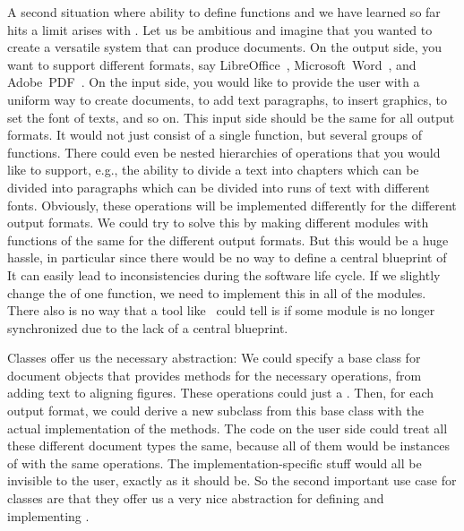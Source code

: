 A second situation where ability to define functions and we have learned so far hits a limit arises with .
Let us be ambitious and imagine that you wanted to create a versatile system that can produce documents.
On the output side, you want to support different formats, say LibreOffice~\cite{DF2024LTDF,GL2012LTSOOSSCBAFACSOL}, Microsoft~Word~\cite{MS2024MW,DR2019STFAWAUMW}, and Adobe~PDF~\cite{A2024WDPM,A2008P3DMPDFP1P1}.
On the input side, you would like to provide the user with a uniform way to create documents, to add text paragraphs, to insert graphics, to set the font of texts, and so on.
This input side  should be the same for all output formats.
It would not just consist of a single function, but several groups of functions.
There could even be nested hierarchies of operations that you would like to support, e.g., the ability to divide a text into chapters which can be divided into paragraphs which can be divided into runs of text with different fonts.
Obviously, these operations will be implemented differently for the different output formats.
We could try to solve this by making different modules with functions of the same  for the different output formats.
But this would be a huge hassle, in particular since there would be no way to define a central blueprint of 
It can easily lead to inconsistencies during the software life cycle.
If we slightly change the  of one function, we need to implement this in all of the modules.
There also is no way that a tool like \ruff\ could tell is if some module is no longer synchronized due to the lack of a central blueprint.

Classes offer us the necessary abstraction:
We could specify a base class  for document objects that provides methods for the necessary operations, from adding text to aligning figures.
These operations could just  a .
Then, for each output format, we could derive a new subclass from this base class with the actual implementation of the methods.
The code on the user side could treat all these different document types the same, because all of them would be instances of  with the same operations.
The implementation-specific stuff would all be invisible to the user, exactly as it should be.
So the second important use case for classes are that they offer us a very nice abstraction for defining and implementing .

